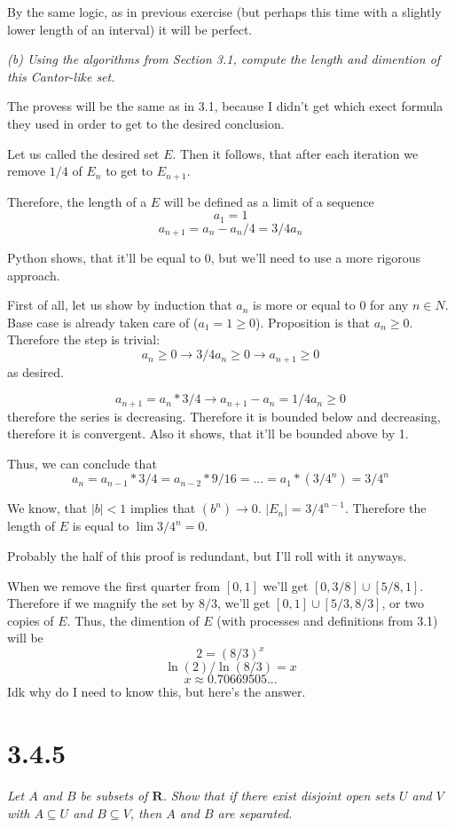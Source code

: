 \documentclass[11pt,oneside,titlepage]{article}
\begin{document}
By the same logic, as in previous exercise (but perhaps this time with a
slightly lower length of an interval) it will be perfect.

\textit{(b) Using the algorithms from Section 3.1, compute the length and
  dimention of this Cantor-like set.}

The provess will be the same as in 3.1, because I didn't get which
exect formula they used in order to get to the desired conclusion.

Let us called the desired set $E$. Then it follows, that after each iteration
we remove $1/4$ of $E_n$ to get to $E_{n + 1}$.


Therefore, the length of a $E$ will be defined as a limit of
a sequence
$$a_1 = 1$$
$$a_{n + 1} = a_n - a_n/4 = 3/4 a_n$$

Python shows, that it'll be equal to 0, but we'll need to use
a more rigorous approach.

First of all, let us show by induction that $a_n$ is more or equal to $0$
for any $n \in N$. Base case is already taken care of ($a_1  = 1\geq 0$).
Proposition is that $a_n \geq 0$. Therefore the step is trivial:
$$a_n \geq 0 \to 3/4 a_n \geq 0 \to a_{n + 1} \geq 0$$
as desired.

$$a_{n + 1} = a_n * 3/4 \to a_{n + 1} - a_n = 1/4 a_n \geq 0$$
therefore the series is decreasing. Therefore it is bounded below and
decreasing, therefore it is convergent. Also it shows, that it'll be bounded
above by 1.

Thus, we can conclude that
$$a_n = a_{n - 1} * 3/4 = a_{n - 2} * 9/16 = ... = a_1 * (3/4^n) = 3/4^n$$

We know, that $|b| < 1 $ implies that $ (b^n) \to 0$. $|E_n|$ =
$3/4^{n - 1}$. Therefore the length of $E$ is equal to $\lim 3/4^n = 0$.

Probably the half of this proof is redundant, but I'll roll with it anyways.

When we remove the first quarter from $[0, 1]$ we'll get
$[0, 3/8] \cup [5/8, 1]$. Therefore if we magnify the set by $8/3$, we'll get
$[0, 1] \cup [5/3, 8/3]$, or two copies of $E$. Thus, the dimention of $E$
(with processes and definitions from 3.1) will be
$$2 = (8/3)^x$$
$$\ln{(2)} / \ln{(8/3)} = x$$
$$x \approx 0.70669505...$$
Idk why do I need to know this, but here's the answer.

\section*{3.4.5}
\textit{Let $A$ and $B$ be subsets of $\textbf{R}$. Show that if there exist
  disjoint open sets $U$ and $V$ with $A \subseteq U$ and $B \subseteq V$,
  then $A$ and $B$ are separated.}
\end{document}
